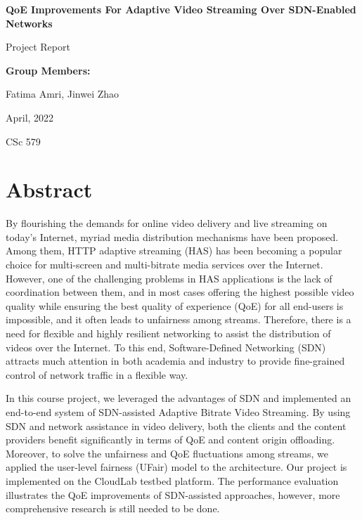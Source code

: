 \documentclass[12pt]{article}
\newcommand\titleofdoc{\textbf{QoE Improvements For Adaptive Video Streaming Over SDN-Enabled Networks}}
\newcommand\GroupName{\textbf{Group Members:}}
\begin{document}
\begin{titlepage}
   \begin{center}
        \vspace*{4cm} 
        \Huge{\titleofdoc} 

        \vspace{0.5cm}
        \Huge{Project Report}
            
        \vspace{3 cm}
        \Large{\GroupName}
       
        \large{Fatima Amri, Jinwei Zhao}
       
        \Large{April, 2022}
        
        \Large{CSc 579}
       
       \vfill
    \end{center}
\end{titlepage}

\setcounter{page}{2}
\pagestyle{fancy}
\fancyhf{}
\rhead{\thepage}

\section*{Abstract}
By flourishing the demands  for online video delivery and live streaming on today's Internet, myriad media distribution mechanisms have been proposed. Among them, HTTP adaptive streaming (HAS) has been becoming a popular choice for multi-screen and multi-bitrate media services over the Internet. However, one of the challenging problems in HAS applications is the lack of coordination between them, and in most cases offering the highest possible video quality while ensuring the best quality of experience (QoE) for all end-users is impossible, and it often leads to unfairness among streams. Therefore, there is a need for flexible and highly resilient networking to assist the distribution of videos over the Internet. To this end, Software-Defined Networking (SDN) attracts much attention in both academia and industry to provide fine-grained control of network traffic in a flexible way. 

In this course project, we leveraged the advantages of SDN and implemented an end-to-end system of SDN-assisted Adaptive Bitrate Video Streaming. By using SDN and network assistance in video delivery, both the clients and the content providers benefit significantly in terms of QoE and content origin offloading. Moreover, to solve the unfairness and QoE fluctuations among streams, we applied the user-level fairness (UFair) model to the architecture. Our project is implemented on the CloudLab testbed platform. The performance evaluation illustrates the QoE improvements of SDN-assisted approaches, however, more comprehensive research is still needed to be done. 
\end{document}
